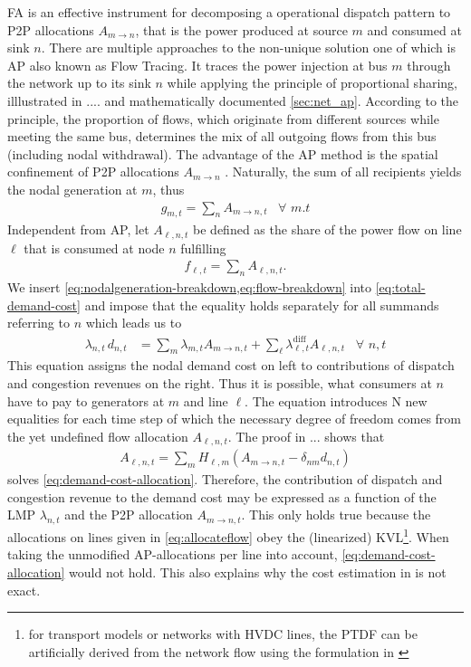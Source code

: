 \documentclass[11pt,twocolumn]{article}
\newcommand{\Forall}[1]{\hspace{10pt} \forall \,\, #1 }
\newcommand{\nodalgeneration}[1][n]{g_{#1,t}}
\newcommand{\flow}{f_{\ell,t}}
\newcommand{\lmp}[1][n]{\lambda_{#1,t}}
\newcommand{\lmpdiff}[1][\ell]{\lmp[#1]^\text{diff}}
\newcommand{\demand}[1][n]{d_{#1,t}}
\newcommand{\ptdf}[1][n]{H_{\ell,#1}}
\newcommand{\allocatepeer}[1][m \rightarrow n]{A_{#1,t}}
\newcommand{\allocateflow}[1][n]{A_{\ell,#1,t}}
\begin{document}
\ac{FA} is an effective instrument for decomposing a operational dispatch pattern to \ac{P2P} allocations $A_{m \rightarrow n}$, that is the power produced at source $m$ and consumed at sink $n$. There are multiple approaches to the non-unique solution one of which is \ac{AP} also known as Flow Tracing. It traces the power injection at bus $m$ through the network up to its sink $n$ while applying the principle of proportional sharing,  illlustrated in .... and mathematically documented \cref{sec:net_ap}. According to the principle, the proportion of flows, which originate from different sources while meeting the same bus, determines the mix of all outgoing flows from this bus (including nodal withdrawal). The advantage of the \ac{AP} method is the spatial confinement of \ac{P2P} allocations $A_{m \rightarrow n}$ \cite{hofmann_techno-economic_2020}. Naturally, the sum of all recipients yields the nodal generation at $m$, thus
\begin{align}
    \nodalgeneration[m] = \sum_n \allocatepeer \Forall{m.t} 
    \label{eq:nodalgeneration-breakdown}
\end{align}   
Independent from \ac{AP}, let $\allocateflow$ be defined as the share of the power flow on line $\ell$ that is consumed at node $n$ fulfilling
\begin{align}
    \flow = \sum_n \allocateflow .
    \label{eq:flow-breakdown}
\end{align}
We insert \cref{eq:nodalgeneration-breakdown,eq:flow-breakdown} into \cref{eq:total-demand-cost} and impose that the equality holds separately for all summands referring to $n$ which leads us to 
\begin{align}
    \lmp\, \demand &= \sum_m \lmp[m] \allocatepeer + \sum_\ell \lmpdiff \allocateflow \Forall{n,t}
    \label{eq:demand-cost-allocation}
\end{align}
This equation assigns the nodal demand cost on left to contributions of dispatch and congestion revenues on the right. Thus it is possible, what consumers at $n$ have to pay to generators at $m$ and line $\ell$. The equation introduces N new equalities for each time step of which the necessary degree of freedom comes from the yet undefined flow allocation $\allocateflow$. The proof in ... shows that 
\begin{align}
    \allocateflow = \sum_m \ptdf[m] (\allocatepeer - \delta_{nm} \demand) 
    \label{eq:allocateflow}
\end{align}
solves \cref{eq:demand-cost-allocation}. Therefore, the contribution of dispatch and congestion revenue to the demand cost may be expressed as a function of the \ac{LMP} $\lmp$ and the \ac{P2P} allocation $\allocatepeer$. This only holds true because the allocations on lines given in \cref{eq:allocateflow} obey the (linearized) \ac{KVL}\footnote{for transport models or networks with \acl{HVDC} lines, the PTDF can be artificially derived from the network flow using the formulation in \cite{hofmann_flow_2020}}. When taking the unmodified \ac{AP}-allocations per line into account, \cref{eq:demand-cost-allocation} would not hold. This also explains why the cost estimation in \cite{meng_investigation_2007} is not exact. \\
\end{document}
